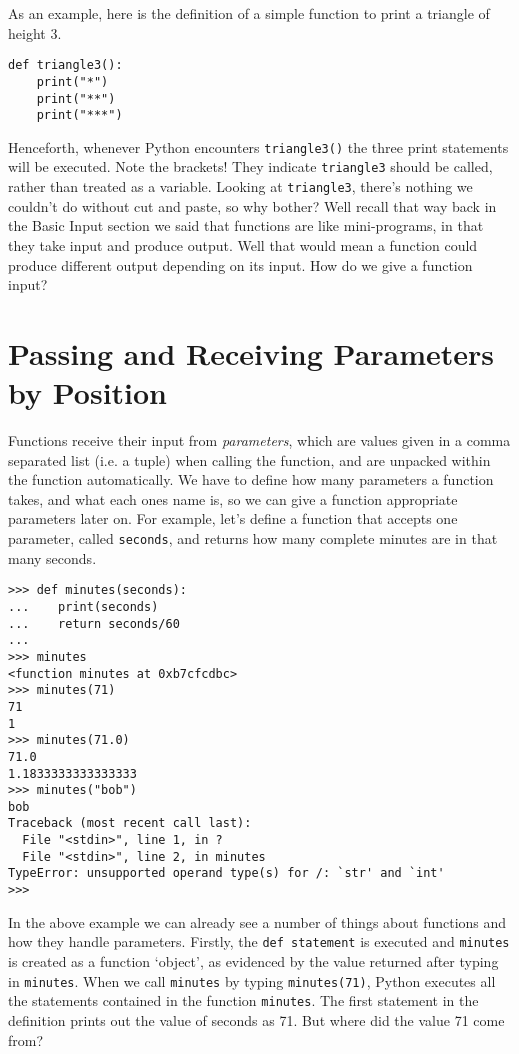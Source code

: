 As an example, here is the definition of a simple function to print   a triangle of height 3.
\begin{lstlisting}
def triangle3():
    print("*")
    print("**")
    print("***")
\end{lstlisting}

Henceforth, whenever Python encounters 
\texttt{triangle3()} the   three print statements will be executed. Note the brackets! They   indicate \texttt{triangle3} should be called, rather than treated as a variable.   Looking at \texttt{triangle3}, there's nothing we couldn't do without cut   and paste, so why bother? Well recall that way back in the Basic Input   section we said that functions are like mini-programs, in that they   take input and produce output. Well that would mean a function could   produce different output depending on its input. How do we give a   function input?

\section{Passing and Receiving Parameters by Position}

Functions receive their input from \textit{parameters}, which are values   given in a comma separated list (i.e. a tuple) when calling the   function, and are unpacked within the function automatically. We have   to define how many parameters a function takes, and what each ones   name is, so we can give a function appropriate parameters later   on. For example, let's define a function that accepts one parameter,   called \texttt{seconds}, and returns how many complete minutes are in that many   seconds.
\begin{lstlisting}
>>> def minutes(seconds):
...    print(seconds)
...    return seconds/60
...
>>> minutes
<function minutes at 0xb7cfcdbc>
>>> minutes(71)
71
1
>>> minutes(71.0)
71.0
1.1833333333333333
>>> minutes("bob")
bob
Traceback (most recent call last):
  File "<stdin>", line 1, in ?
  File "<stdin>", line 2, in minutes
TypeError: unsupported operand type(s) for /: `str' and `int'
>>>
\end{lstlisting}

In the above example we can already see a number of things about   functions and how they handle parameters. Firstly, the \texttt{def statement}   is executed and \texttt{minutes} is created as a function `object', as   evidenced by the value returned after typing in \texttt{minutes}. When we call \texttt{minutes} by typing \texttt{minutes(71)}, Python   executes all the statements contained in the function \texttt{minutes}.   The first statement in the definition prints out the value of seconds   as 71. But where did the value 71 come from?

